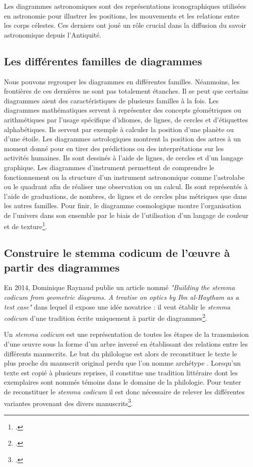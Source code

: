 Les diagrammes astronomiques sont des représentations iconographiques utilisées en astronomie pour illustrer les positions, les mouvements et les relations entre les corps célestes. Ces derniers ont joué un rôle crucial dans la diffusion du savoir astronomique depuis l'Antiquité.

\subsection{Les différentes familles de diagrammes}
Nous pouvons regrouper les diagrammes en différentes familles. Néanmoins, les frontières de ces dernières ne sont pas totalement étanches. Il se peut que certains diagrammes aient des caractéristiques de plusieurs familles à la fois. Les diagrammes mathématiques servent à représenter des concepts géométriques ou arithmétiques par l'usage spécifique d'idiomes, de lignes, de cercles et d'étiquettes alphabétiques. Ils servent par exemple à calculer la position d'une planète ou d'une étoile. Les diagrammes astrologiques montrent la position des astres à un moment donné pour en tirer des prédictions ou des interprétations sur les activités humaines. Ils sont dessinés à l'aide de lignes, de cercles et d'un langage graphique. Les diagrammes d'instrument permettent de comprendre le fonctionnement ou la structure d'un instrument astronomique comme l'astrolabe ou le quadrant afin de réaliser une observation ou un calcul. Ils sont représentés à l'aide de graduations, de nombres, de lignes et de cercles plus métriques que dans les autres familles. Pour finir, le diagramme cosmologique montre l'organisation de l'univers dans son ensemble par le biais de l'utilisation d'un langage de couleur et de texture\footcite{Conference2025Long2025}.



\subsection{Construire le stemma codicum de l'œuvre à partir des diagrammes}

En 2014, Dominique Raynaud publie un article nommé \textit{"Building the stemma codicum from geometric diagrams. A treatise on optics by Ibn al-Haytham as a test case"} dans lequel il expose une idée novatrice : il veut établir le \textit{stemma codicum} d'une tradition écrite uniquement à partir de diagrammes\footcite{raynaudBuildingStemmaCodicum2014}.

Un \textit{stemma codicum} est une représentation de toutes les étapes de la transmission d'une œuvre sous la forme d'un arbre inversé en établissant des relations entre les différents manuscrits. Le but du philologue est alors de reconstituer le texte le plus proche du manuscrit original perdu que l'on nomme \og archétype \fg. Lorsqu'un texte est copié à plusieurs reprises, il constitue une \og tradition littéraire \fg dont les exemplaires sont nommés \og témoins \fg dans le domaine de la philologie. Pour tenter de reconstituer le \textit{stemma codicum} il est donc nécessaire de relever les différentes variantes provenant des divers manuscrits\footcite{pouliquenUsingLatticesReconstructing}.


